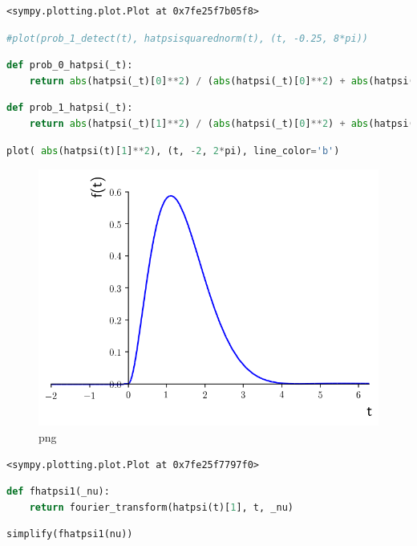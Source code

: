 \begin{lstlisting}
<sympy.plotting.plot.Plot at 0x7fe25f7b05f8>
\end{lstlisting}

\begin{lstlisting}[language=Python]
#plot(prob_1_detect(t), hatpsisquarednorm(t), (t, -0.25, 8*pi))
\end{lstlisting}

\begin{lstlisting}[language=Python]
def prob_0_hatpsi(_t):
    return abs(hatpsi(_t)[0]**2) / (abs(hatpsi(_t)[0]**2) + abs(hatpsi(_t)[1]**2))
\end{lstlisting}

\begin{lstlisting}[language=Python]
def prob_1_hatpsi(_t):
    return abs(hatpsi(_t)[1]**2) / (abs(hatpsi(_t)[0]**2) + abs(hatpsi(_t)[1]**2))
\end{lstlisting}

\begin{lstlisting}[language=Python]
plot( abs(hatpsi(t)[1]**2), (t, -2, 2*pi), line_color='b')
\end{lstlisting}

\begin{figure}
\centering
\includegraphics[width=0.6\linewidth]{output_55_0.png}
\caption[]{png}
\end{figure}

\begin{lstlisting}
<sympy.plotting.plot.Plot at 0x7fe25f7797f0>
\end{lstlisting}

\begin{lstlisting}[language=Python]
def fhatpsi1(_nu):
    return fourier_transform(hatpsi(t)[1], t, _nu)
\end{lstlisting}

\begin{lstlisting}[language=Python]
simplify(fhatpsi1(nu))
\end{lstlisting}

